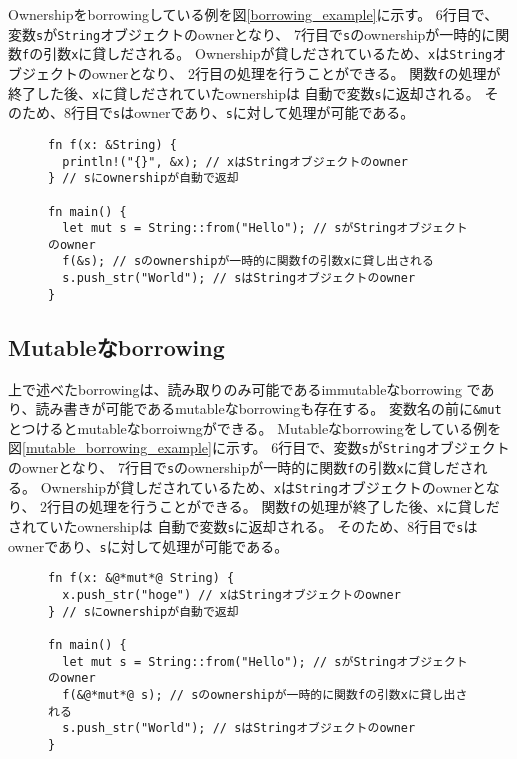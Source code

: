 \documentclass{sumiilab-paper}
\theoremstyle{mystyle}
\numberwithin{definition}{chapter} %
\begin{document}
Ownershipをborrowingしている例を図\ref{borrowing_example}に示す。
6行目で、変数\texttt{s}が\texttt{String}オブジェクトのownerとなり、
7行目で\texttt{s}のownershipが一時的に関数\texttt{f}の引数\texttt{x}に貸しだされる。
Ownershipが貸しだされているため、\texttt{x}は\texttt{String}オブジェクトのownerとなり、
2行目の処理を行うことができる。
関数\texttt{f}の処理が終了した後、\texttt{x}に貸しだされていたownershipは
自動で変数\texttt{s}に返却される。
そのため、8行目で\texttt{s}はownerであり、\texttt{s}に対して処理が可能である。

\begin{figure}[htp]
\begin{lstlisting}[caption=Borrowingの例, label=borrowing_example, captionpos=b]
fn f(x: &String) {
  println!("{}", &x); // xはStringオブジェクトのowner
} // sにownershipが自動で返却

fn main() {
  let mut s = String::from("Hello"); // sがStringオブジェクトのowner
  f(&s); // sのownershipが一時的に関数fの引数xに貸し出される
  s.push_str("World"); // sはStringオブジェクトのowner
}
\end{lstlisting}
\end{figure}

\subsection{Mutableなborrowing}
上で述べたborrowingは、読み取りのみ可能であるimmutableなborrowing
であり、読み書きが可能であるmutableなborrowingも存在する。
変数名の前に\texttt{\&mut}とつけるとmutableなborroiwngができる。
Mutableなborrowingをしている例を図\ref{mutable_borrowing_example}に示す。
6行目で、変数\texttt{s}が\texttt{String}オブジェクトのownerとなり、
7行目で\texttt{s}のownershipが一時的に関数\texttt{f}の引数\texttt{x}に貸しだされる。
Ownershipが貸しだされているため、\texttt{x}は\texttt{String}オブジェクトのownerとなり、
2行目の処理を行うことができる。
関数\texttt{f}の処理が終了した後、\texttt{x}に貸しだされていたownershipは
自動で変数\texttt{s}に返却される。
そのため、8行目で\texttt{s}はownerであり、\texttt{s}に対して処理が可能である。

\begin{figure}[htp]
\begin{lstlisting}[caption=Mutableなborrowingの例, label=mutable_borrowing_example, captionpos=b]
fn f(x: &@*mut*@ String) {
  x.push_str("hoge") // xはStringオブジェクトのowner
} // sにownershipが自動で返却

fn main() {
  let mut s = String::from("Hello"); // sがStringオブジェクトのowner
  f(&@*mut*@ s); // sのownershipが一時的に関数fの引数xに貸し出される
  s.push_str("World"); // sはStringオブジェクトのowner
}
\end{lstlisting}
\end{figure}
\end{document}
